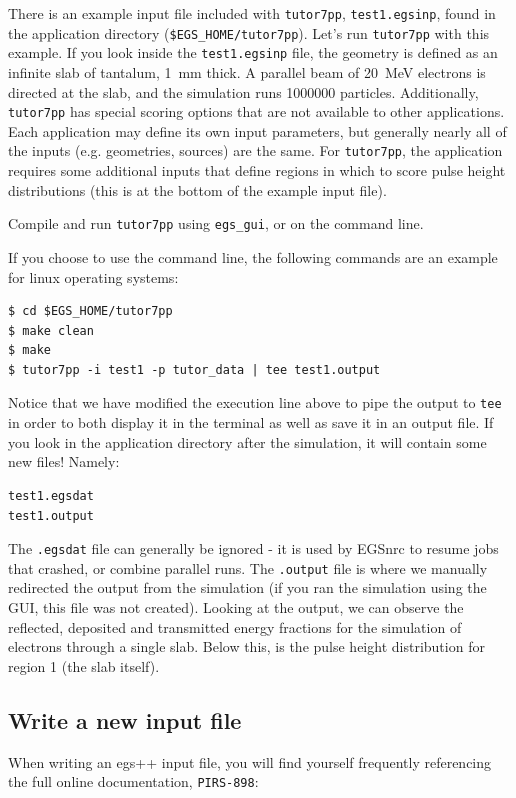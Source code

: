 \documentclass[12pt,twoside]{article}
\begin{document}
There is an example input file included with \Verb+tutor7pp+, \Verb+test1.egsinp+, found in the application directory (\Verb+$EGS_HOME/tutor7pp+). Let's run \Verb+tutor7pp+ with this example. If you look inside the \Verb+test1.egsinp+ file, the geometry is defined as an infinite slab of tantalum, 1~mm thick. A parallel beam of 20~MeV electrons is directed at the slab, and the simulation runs 1000000 particles. Additionally, \Verb+tutor7pp+ has special scoring options that are not available to other applications. Each application may define its own input parameters, but generally nearly all of the inputs (e.g. geometries, sources) are the same. For \Verb+tutor7pp+, the application requires some additional inputs that define regions in which to score pulse height distributions (this is at the bottom of the example input file).

Compile and run \Verb+tutor7pp+ using \Verb+egs_gui+, or on the command line.

If you choose to use the command line, the following commands are an example for linux operating systems:
\begin{lstlisting}
$ cd $EGS_HOME/tutor7pp
$ make clean
$ make
$ tutor7pp -i test1 -p tutor_data | tee test1.output
\end{lstlisting}

Notice that we have modified the execution line above to pipe the output to \Verb+tee+ in order to both display it in the terminal as well as save it in an output file. If you look in the application directory after the simulation, it will contain some new files! Namely:
\begin{lstlisting}[backgroundcolor=\color{white}]
test1.egsdat
test1.output
\end{lstlisting}

The \Verb+.egsdat+ file can generally be ignored - it is used by EGSnrc to resume jobs that crashed, or combine parallel runs. The \Verb+.output+ file is where we manually redirected the output from the simulation (if you ran the simulation using the GUI, this file was not created). Looking at the output, we can observe the reflected, deposited and transmitted energy fractions for the simulation of electrons through a single slab. Below this, is the pulse height distribution for region 1 (the slab itself).

\subsection{Write a new input file}
When writing an egs++ input file, you will find yourself frequently referencing the full online documentation, \Verb+PIRS-898+:
\end{document}
